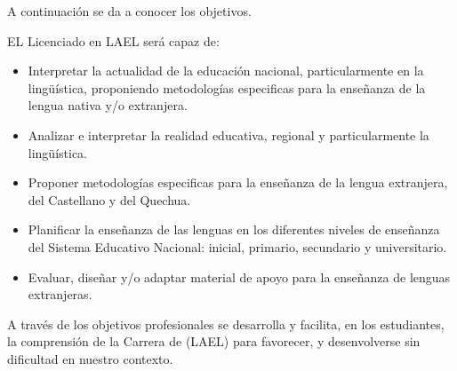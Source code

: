 A continuación se da a conocer los objetivos.
  
EL Licenciado en LAEL será capaz de:

\begin{itemize}

\item Interpretar la actualidad de la educación nacional, particularmente en
la lingüística, proponiendo metodologías especificas para la enseñanza de la
lengua nativa y/o extranjera. 
\item Analizar e interpretar la realidad educativa, regional y particularmente
la lingüística.
\item Proponer metodologías especificas para la enseñanza de la lengua
extranjera, del Castellano y del Quechua.
\item Planificar la enseñanza de las lenguas en los diferentes niveles de
enseñanza del Sistema Educativo Nacional: inicial, primario, secundario y
universitario.
\item Evaluar, diseñar y/o adaptar material de apoyo para la enseñanza de
lenguas extranjeras.

\end{itemize}

A través de los objetivos profesionales se desarrolla y facilita, en los
estudiantes, la comprensión de la Carrera de (LAEL) para favorecer, y
desenvolverse sin dificultad en nuestro contexto. \cite{CMNPZ2014}